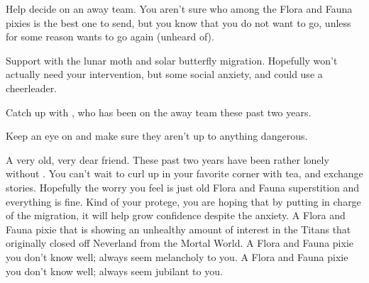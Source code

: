 \documentclass[char]{PP}
\begin{document}
\begin{itemz}
	\item Help \cSHead{} decide on an away team. You aren’t sure who among the Flora and Fauna pixies is the best one to send, but you know that you do not want to go, unless for some reason \cSPM{} wants to go again (unheard of).
	\item Support \cFButterfly{} with the lunar moth and solar butterfly migration. Hopefully \cFButterfly{\they} won’t actually need your intervention, but \cFButterfly{\they} \cFButterfly{\have} some social anxiety, and could use a cheerleader.
	\item Catch up with \cSPM{}, who has been on the away team these past two years.
	\item Keep an eye on \cFTitan{} and make sure they aren’t up to anything dangerous.
\end{itemz}

\begin{itemz}[Notes]
	\item 
\end{itemz}

\begin{contacts}
	\contact{\cSPM{}} A very old, very dear friend. These past two years have been rather lonely without \cSPM{\them}. You can’t wait to curl up in your favorite corner with tea, and exchange stories. Hopefully the worry you feel is just old Flora and Fauna superstition and everything is fine.
	\contact{\cFButterfly{}} Kind of your protege, you are hoping that by putting \cFButterfly{\them} in charge of the migration, it will help grow \cFButterfly{\their} confidence despite the anxiety.
	\contact{\cFTitan{}}  A Flora and Fauna pixie that is showing an unhealthy amount of interest in the Titans that originally closed off Neverland from the Mortal World.
	\contact{\cFWanabe{}} A Flora and Fauna pixie you don’t know well; \cFWanabe{\they} always seem\cFWanabe{\plural} melancholy to you.
	\contact{\cFHeart{}} A Flora and Fauna pixie you don’t know well; \cFHeart{\they} always seem\cFHeart{\plural} jubilant to you.
\end{contacts}
\end{document}
